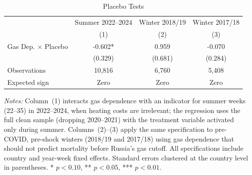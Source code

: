 \begin{table}[!htbp]
\centering
\caption{Placebo Tests}
\label{tab:placebos}
\begin{tabular}{lccc}
\hline\hline
 & Summer 2022--2024 & Winter 2018/19 & Winter 2017/18 \\
 & (1) & (2) & (3) \\
\hline
\addlinespace
Gas Dep. $\times$ Placebo & -0.602* & 0.959 & -0.070 \\
 & (0.329) & (0.681) & (0.284) \\
\addlinespace
Observations & 10,816 & 6,760 & 5,408 \\
Expected sign & Zero & Zero & Zero \\
\hline\hline
\end{tabular}
\begin{tablenotes}[flushleft]
\small
\item \textit{Notes:} Column~(1) interacts gas dependence with an indicator for summer weeks (22--35) in 2022--2024, when heating costs are irrelevant; the regression uses the full clean sample (dropping 2020--2021) with the treatment variable activated only during summer. Columns~(2)--(3) apply the same specification to pre-COVID, pre-shock winters (2018/19 and 2017/18) using gas dependence that should not predict mortality before Russia's gas cutoff. All specifications include country and year-week fixed effects. Standard errors clustered at the country level in parentheses. * $p<0.10$, ** $p<0.05$, *** $p<0.01$.
\end{tablenotes}
\end{table}

